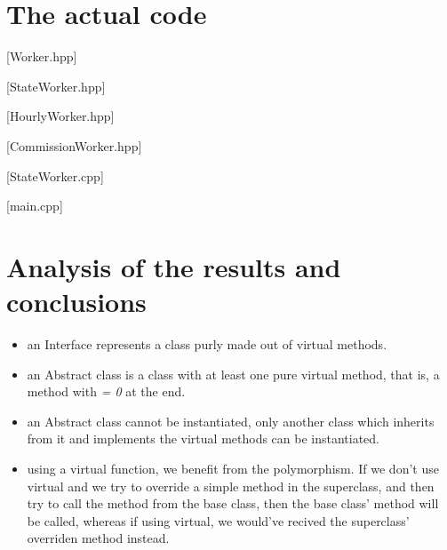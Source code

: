 \documentclass{article}
\begin{document}
	\section{The actual code}
		\begin{center}

		\begin{minipage}{\textwidth}
			[Worker.hpp]
		\end{minipage}

		\begin{minipage}{\textwidth}
			[StateWorker.hpp]
		\end{minipage}

		\begin{minipage}{\textwidth}
			[HourlyWorker.hpp]
		\end{minipage}

		\begin{minipage}{\textwidth}
			[CommissionWorker.hpp]
		\end{minipage}

		\begin{minipage}{\textwidth}
			[StateWorker.cpp]
		\end{minipage}

		\begin{minipage}{\textwidth}
			[main.cpp]
		\end{minipage}

		\end{center}

	\section{Analysis of the results and conclusions}
		\begin{itemize}
			\item an Interface represents a class purly made out of virtual methods.

			\item an Abstract class is a class with at least one pure virtual method, that is, a method with \textit{= 0} at the end.

			\item an Abstract class cannot be instantiated, only another class which inherits from it and implements the virtual methods can be instantiated.

			\item using a virtual function, we benefit from the polymorphism. If we don't use virtual and we try to override a simple method in the superclass, and then try to call the method from the base class, then the base class' method will be called, whereas if using virtual, we would've recived the superclass' overriden method instead.
		\end{itemize}
\end{document}
